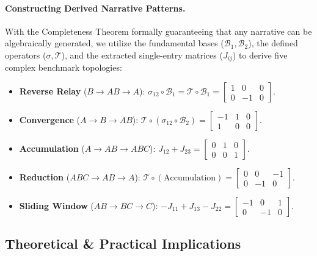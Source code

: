 \documentclass[sigconf,review,anonymous]{acmart}
\theoremstyle{definition}
\newcommand{\calB}{\mathcal{B}}
\newcommand{\calT}{\mathcal{T}}
\begin{document}
\paragraph{Constructing Derived Narrative Patterns.}
With the Completeness Theorem formally guaranteeing that any narrative can be algebraically generated, we utilize the fundamental bases ($\calB_1, \calB_2$), the defined operators ($\sigma, \calT$), and the extracted single-entry matrices ($J_{ij}$) to derive five complex benchmark topologies:
\begin{itemize}[leftmargin=*,nosep]
  \item \textbf{Reverse Relay} ($B \!\to\! AB \!\to\! A$): $\sigma_{12} \circ \calB_1 = \calT \circ \calB_1 = \left[\begin{smallmatrix} 1 & 0 & 0 \\ 0 & -1 & 0 \end{smallmatrix}\right]$.
  \item \textbf{Convergence} ($A \!\to\! B \!\to\! AB$): $\calT \circ (\sigma_{12} \circ \calB_2) = \left[\begin{smallmatrix} -1 & 1 & 0 \\ 1 & 0 & 0 \end{smallmatrix}\right]$.
  \item \textbf{Accumulation} ($A \!\to\! AB \!\to\! ABC$): $J_{12} + J_{23} = \left[\begin{smallmatrix} 0 & 1 & 0 \\ 0 & 0 & 1 \end{smallmatrix}\right]$.
  \item \textbf{Reduction} ($ABC \!\to\! AB \!\to\! A$): $\calT \circ (\text{Accumulation}) = \left[\begin{smallmatrix} 0 & 0 & -1 \\ 0 & -1 & 0 \end{smallmatrix}\right]$.
  \item \textbf{Sliding Window} ($AB \!\to\! BC \!\to\! C$): $-J_{11} + J_{13} - J_{22} = \left[\begin{smallmatrix} -1 & 0 & 1 \\ 0 & -1 & 0 \end{smallmatrix}\right]$.
\end{itemize}

\subsection{Theoretical \& Practical Implications}
\label{sec:implications}
\end{document}

